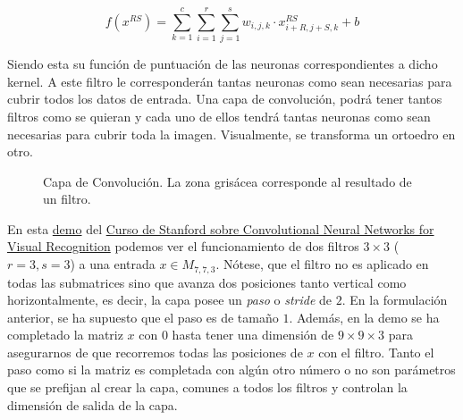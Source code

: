 $$f(x^{RS})=\sum_{k=1}^{c}\sum_{i=1}^{r} \sum_{j=1}^{s} w_{i,j,k} \cdot x_{i+R,j+S,k}^{RS}+b$$

Siendo esta su función de puntuación de las neuronas correspondientes a dicho kernel. A este filtro le corresponderán tantas neuronas como sean necesarias para cubrir todos los datos de entrada. Una capa de convolución, podrá tener tantos filtros como se quieran y cada uno de ellos tendrá tantas neuronas como sean necesarias para cubrir toda la imagen. Visualmente, se transforma un ortoedro en otro.\newline

\begin{figure}
\centering


\caption{Capa de Convolución. La zona grisácea corresponde al resultado de un filtro. }
\label{fig:convolution}
\end{figure}

En esta \href{https://cs231n.github.io/assets/conv-demo/index.html}{demo} del \href{http://cs231n.stanford.edu/}{Curso de Stanford sobre Convolutional Neural Networks for Visual Recognition} podemos ver el funcionamiento de dos filtros $3\times 3$ ($r=3,s=3$) a una entrada $x\in M_{7,7,3}$. Nótese, que el filtro no es aplicado en todas las submatrices sino que avanza dos posiciones tanto vertical como horizontalmente, es decir, la capa posee un \emph{paso} o \emph{stride} de $2$. En la formulación anterior, se ha supuesto que el paso es de tamaño $1$. Además, en la demo se ha completado la matriz $x$ con $0$ hasta tener una dimensión de $9\times 9\times 3$ para asegurarnos de que recorremos todas las posiciones de $x$ con el filtro. Tanto el paso como si la matriz es completada con algún otro número o no son parámetros que se prefijan al crear la capa, comunes a todos los filtros y controlan la dimensión de salida de la capa.


